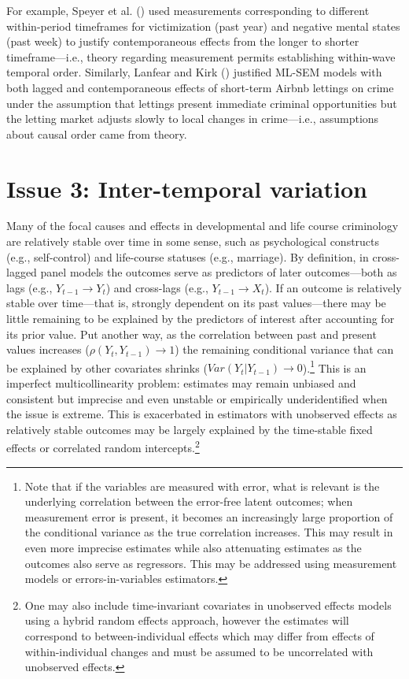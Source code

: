 \documentclass[
  letterpaper,
  DIV=11,
  numbers=noendperiod]{scrartcl}
\begin{document}
For example, Speyer et al. ()
used measurements corresponding to different within-period timeframes
for victimization (past year) and negative mental states (past week) to
justify contemporaneous effects from the longer to shorter
timeframe---i.e., theory regarding measurement permits establishing
within-wave temporal order. Similarly, Lanfear and Kirk
() justified ML-SEM models with
both lagged and contemporaneous effects of short-term Airbnb lettings on
crime under the assumption that lettings present immediate criminal
opportunities but the letting market adjusts slowly to local changes in
crime---i.e., assumptions about causal order came from theory.

\section{Issue 3: Inter-temporal
variation}\label{issue-3-inter-temporal-variation}

Many of the focal causes and effects in developmental and life course
criminology are relatively stable over time in some sense, such as
psychological constructs (e.g., self-control) and life-course statuses
(e.g., marriage). By definition, in cross-lagged panel models the
outcomes serve as predictors of later outcomes---both as lags (e.g.,
\(Y_{t-1} \rightarrow Y_t\)) and cross-lags (e.g.,
\(Y_{t-1} \rightarrow X_t\)). If an outcome is relatively stable over
time---that is, strongly dependent on its past values---there may be
little remaining to be explained by the predictors of interest after
accounting for its prior value. Put another way, as the correlation
between past and present values increases
(\(\rho(Y_t,Y_{t-1}) \rightarrow 1\)) the remaining conditional variance
that can be explained by other covariates shrinks
(\(Var(Y_t|Y_{t-1}) \rightarrow 0\)).\footnote{Note that if the
  variables are measured with error, what is relevant is the underlying
  correlation between the error-free latent outcomes; when measurement
  error is present, it becomes an increasingly large proportion of the
  conditional variance as the true correlation increases. This may
  result in even more imprecise estimates while also attenuating
  estimates as the outcomes also serve as regressors. This may be
  addressed using measurement models or errors-in-variables estimators.}
This is an imperfect multicollinearity problem: estimates may remain
unbiased and consistent but imprecise and even unstable or empirically
underidentified when the issue is extreme. This is exacerbated in
estimators with unobserved effects as relatively stable outcomes may be
largely explained by the time-stable fixed effects or correlated random
intercepts.\footnote{One may also include time-invariant covariates in
  unobserved effects models using a hybrid random effects approach,
  however the estimates will correspond to between-individual effects
  which may differ from effects of within-individual changes and must be
  assumed to be uncorrelated with unobserved effects.}
\end{document}
